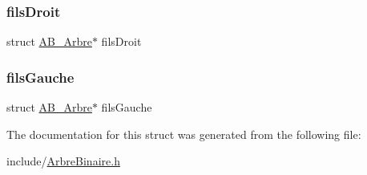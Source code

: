 \mbox{\label{struct_a_b___arbre_a0e147c049cd518a8ef737af42272b77e}} 
\subsubsection{\texorpdfstring{fils\+Droit}{filsDroit}}
{\footnotesize\ttfamily struct \hyperlink{struct_a_b___arbre}{A\+B\+\_\+\+Arbre}$\ast$ fils\+Droit}

\mbox{\label{struct_a_b___arbre_a083d0246e3cd80f6e7cc2ee406f6481c}} 
\subsubsection{\texorpdfstring{fils\+Gauche}{filsGauche}}
{\footnotesize\ttfamily struct \hyperlink{struct_a_b___arbre}{A\+B\+\_\+\+Arbre}$\ast$ fils\+Gauche}



The documentation for this struct was generated from the following file\+:\begin{DoxyCompactItemize}
\item 
include/\hyperlink{_arbre_binaire_8h}{Arbre\+Binaire.\+h}\end{DoxyCompactItemize}
